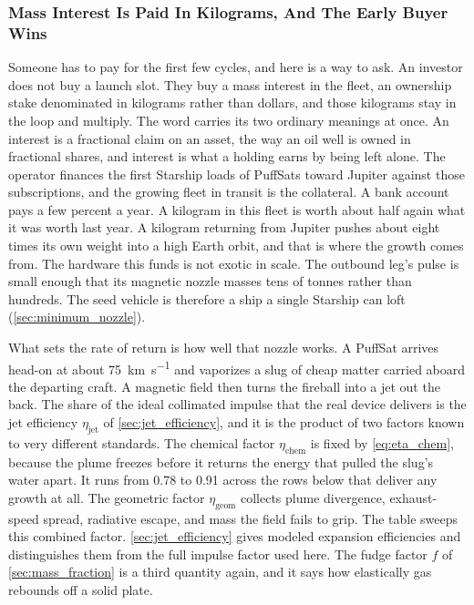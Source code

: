 \documentclass{article}
\begin{document}
\subsubsection{Mass Interest Is Paid In Kilograms, And The Early Buyer Wins}\label{sec:mass_interest}
Someone has to pay for the first few cycles, and here is a way to ask. An investor does not buy a launch slot. They buy a mass interest in the fleet, an ownership stake denominated in kilograms rather than dollars, and those kilograms stay in the loop and multiply. The word carries its two ordinary meanings at once. An interest is a fractional claim on an asset, the way an oil well is owned in fractional shares, and interest is what a holding earns by being left alone. The operator finances the first Starship loads of PuffSats toward Jupiter against those subscriptions, and the growing fleet in transit is the collateral. A bank account pays a few percent a year. A kilogram in this fleet is worth about half again what it was worth last year. A kilogram returning from Jupiter pushes about eight times its own weight into a high Earth orbit, and that is where the growth comes from. The hardware this funds is not exotic in scale. The outbound leg's pulse is small enough that its magnetic nozzle masses tens of tonnes rather than hundreds. The seed vehicle is therefore a ship a single Starship can loft (\autoref{sec:minimum_nozzle}).

What sets the rate of return is how well that nozzle works. A PuffSat arrives head-on at about \SI{75}{\kilo\meter\per\second} and vaporizes a slug of cheap matter carried aboard the departing craft. A magnetic field then turns the fireball into a jet out the back. The share of the ideal collimated impulse that the real device delivers is the jet efficiency $\eta_{\mathrm{jet}}$ of \autoref{sec:jet_efficiency}, and it is the product of two factors known to very different standards. The chemical factor $\eta_{\mathrm{chem}}$ is fixed by \autoref{eq:eta_chem}, because the plume freezes before it returns the energy that pulled the slug's water apart. It runs from 0.78 to 0.91 across the rows below that deliver any growth at all. The geometric factor $\eta_{\mathrm{geom}}$ collects plume divergence, exhaust-speed spread, radiative escape, and mass the field fails to grip. The table sweeps this combined factor. \autoref{sec:jet_efficiency} gives modeled expansion efficiencies and distinguishes them from the full impulse factor used here. The fudge factor $f$ of \autoref{sec:mass_fraction} is a third quantity again, and it says how elastically gas rebounds off a solid plate.
\end{document}
